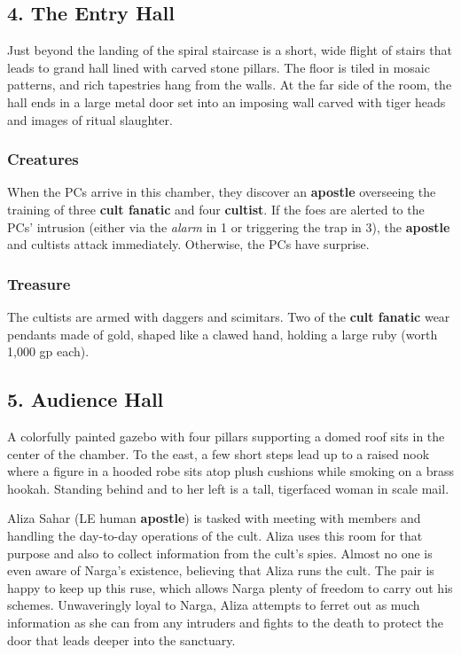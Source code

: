 \documentclass[10pt,a4paper,twoside,bg=print,twocolumn,openany,nodeprecatedcode]{dndbook}
\begin{document}
\subsection{4. The Entry Hall}
\begin{DndReadAloud}{}
Just beyond the landing of the spiral staircase is a short, wide flight of stairs that leads to grand hall lined with carved stone pillars. The floor is tiled in mosaic patterns, and rich tapestries hang from the walls. At the far side of the room, the hall ends in a large metal door set into an imposing wall carved with tiger heads and images of ritual slaughter.

\end{DndReadAloud}

\subsubsection{Creatures}
When the PCs arrive in this chamber, they discover an \textbf{apostle} overseeing the training of three \textbf{cult fanatic} and four \textbf{cultist}. If the foes are alerted to the PCs' intrusion (either via the \textit{alarm} in 1 or triggering the trap in 3), the \textbf{apostle} and cultists attack immediately. Otherwise, the PCs have surprise.

\subsubsection{Treasure}
The cultists are armed with daggers and scimitars. Two of the \textbf{cult fanatic} wear pendants made of gold, shaped like a clawed hand, holding a large ruby (worth 1,000 gp each).

\subsection{5. Audience Hall}
\begin{DndReadAloud}{}
A colorfully painted gazebo with four pillars supporting a domed roof sits in the center of the chamber. To the east, a few short steps lead up to a raised nook where a figure in a hooded robe sits atop plush cushions while smoking on a brass hookah. Standing behind and to her left is a tall, tigerfaced woman in scale mail.

\end{DndReadAloud}

Aliza Sahar (LE human \textbf{apostle}) is tasked with meeting with members and handling the day-to-day operations of the cult. Aliza uses this room for that purpose and also to collect information from the cult's spies. Almost no one is even aware of Narga's existence, believing that Aliza runs the cult. The pair is happy to keep up this ruse, which allows Narga plenty of freedom to carry out his schemes. Unwaveringly loyal to Narga, Aliza attempts to ferret out as much information as she can from any intruders and fights to the death to protect the door that leads deeper into the sanctuary.
\end{document}
